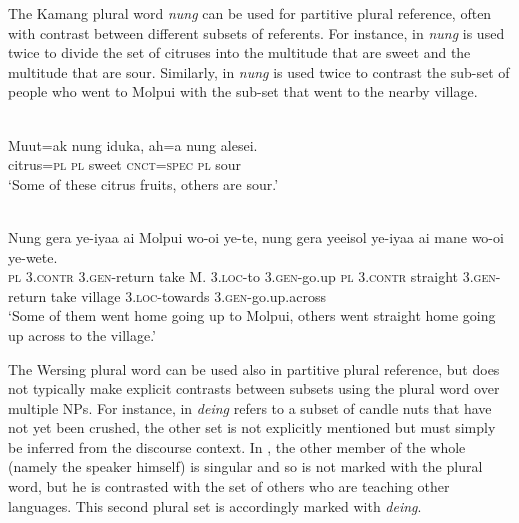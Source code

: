 The Kamang plural word \textit{nung} can be used for partitive plural reference, often with contrast between different subsets of referents. For instance, in  \textit{nung} is used twice to divide the set of citruses into the multitude that are sweet and the multitude that are sour. Similarly, in  \textit{nung} is used twice to contrast the sub-set of people who went to Molpui with the sub-set that went to the nearby village.


\ea%
\label{ex:9:84}
 \\
\gll  Muut=ak nung iduka, ah=a nung alesei. \\
   citrus=\textsc{pl} \textsc{pl} sweet \textsc{cnct=spec} \textsc{pl} sour  \\
\glt `Some of these citrus fruits, others are sour.'
\z







\ea%
\label{ex:9:85}
 \\
\gll  Nung gera ye-iyaa ai Molpui wo-oi ye-te,  nung gera yeeisol ye-iyaa ai  mane wo-oi ye-wete. \\
    \textsc{pl} \textsc{3.contr} \textsc{3.gen}-return take M. 3.\textsc{loc}-to \textsc{3.gen}-go.up  \textsc{pl} \textsc{3.contr} straight \textsc{3.gen}-return take  village 3.\textsc{loc}-towards \textsc{3.gen}-go.up.across \\
\glt `Some of them went home going up to Molpui, others went straight home going up across to the village.'
\z




The Wersing plural word can be used also in partitive plural reference, but does not typically make explicit contrasts between subsets using the plural word over multiple NPs. For instance, in  \textit{deing} refers to a subset of candle nuts that have not yet been crushed, the other set is not explicitly mentioned but must simply be inferred from the discourse context. In , the other member of the whole (namely the speaker himself) is singular and so is not marked with the plural word, but he is contrasted with the set of others who are teaching other languages. This second plural set is accordingly marked with \textit{deing}.


